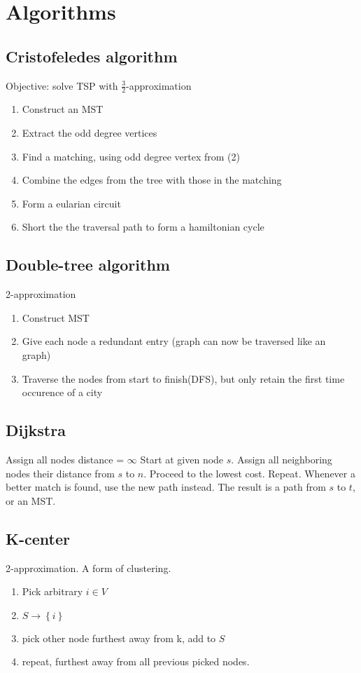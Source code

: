 \section{Algorithms}

\subsection{Cristofeledes algorithm}
Objective: solve TSP with $\frac{3}{2}$-approximation
\begin{enumerate}
    \item Construct an MST
    \item Extract the odd degree vertices
    \item Find a matching, using odd degree vertex from (2)
    \item Combine the edges from the tree with those in the matching
    \item Form a eularian circuit
    \item Short the the traversal path to form a hamiltonian cycle
\end{enumerate}

\subsection{Double-tree algorithm}
2-approximation
\begin{enumerate}
    \item Construct MST
    \item Give each node a redundant entry (graph can now be traversed like
            an~ graph)
    \item Traverse the nodes from start to finish(DFS), but only retain the first
        time occurence of a city
\end{enumerate}

\subsection{Dijkstra}
Assign all nodes distance = $\infty$
Start at given node $s$. Assign all neighboring nodes their distance from $s$
to $n$. Proceed to the lowest cost. Repeat. Whenever a better match is found,
use the new path instead. The result is a path from $s$ to $t$, or an MST.

\subsection{K-center}
2-approximation. A form of clustering.
\begin{enumerate}
    \item Pick arbitrary $i \in V$
    \item $S \rightarrow \left\{i\right\}$
    \item pick other node furthest away from k, add to $S$
    \item repeat, furthest away from all previous picked nodes.
\end{enumerate}

